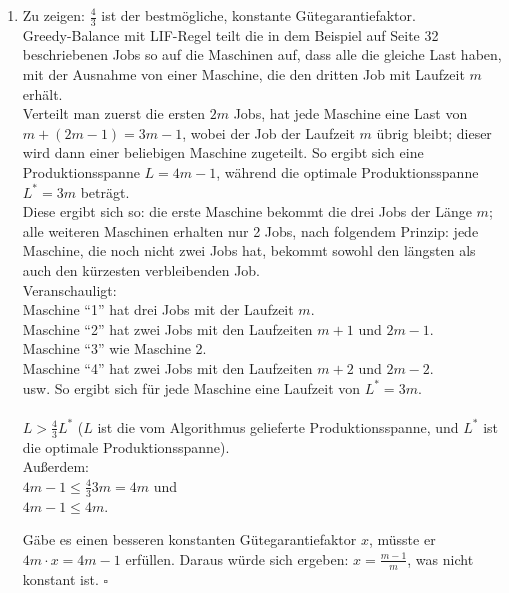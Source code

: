 \documentclass[a4paper]{scrartcl}
\begin{document}
\begin{enumerate}[label=\bfseries \arabic*.]
\begin{enumerate}
\end{enumerate}

\item %
    Zu zeigen: $\frac{4}{3}$ ist der bestmögliche, konstante Gütegarantiefaktor.\\
    Greedy-Balance mit LIF-Regel teilt die in dem Beispiel auf Seite 32 beschriebenen Jobs so
    auf die Maschinen auf, dass alle die gleiche Last haben, mit der Ausnahme von einer Maschine,
    die den dritten Job mit Laufzeit $m$ erhält.\\
    Verteilt man zuerst die ersten $2m$ Jobs, hat jede Maschine eine Last von $m + (2m-1) = 3m-1$, wobei der Job
    der Laufzeit $m$ übrig bleibt; dieser wird dann einer beliebigen Maschine zugeteilt.
    So ergibt sich eine Produktionsspanne $L=4m-1$, während die optimale Produktionsspanne
    $L^*=3m$ beträgt.
    \\
    Diese ergibt sich so: die erste Maschine bekommt die drei Jobs der Länge $m$; alle weiteren Maschinen
    erhalten nur 2 Jobs, nach folgendem Prinzip: jede Maschine, die noch nicht zwei Jobs hat, bekommt
    sowohl den längsten als auch den kürzesten verbleibenden Job.\\
    \newpage
    Veranschauligt:\\
    Maschine ``1'' hat drei Jobs mit der Laufzeit $m$.\\
    Maschine ``2'' hat zwei Jobs mit den Laufzeiten $m+1$ und $2m-1$.\\
    Maschine ``3'' wie Maschine 2.\\
    Maschine ``4'' hat zwei Jobs mit den Laufzeiten $m+2$ und $2m-2$.\\
    usw. So ergibt sich für jede Maschine eine Laufzeit von $L^*=3m$.
    \\ \\
    $L > \frac{4}{3}L^*$ ($L$ ist die vom Algorithmus gelieferte Produktionsspanne, und $L^*$ ist die
    optimale Produktionsspanne).\\
    Außerdem:\\
    $4m-1 \leq \frac{4}{3} 3m = 4m$ und\\
    $4m-1 \leq 4m$.

    Gäbe es einen besseren konstanten Gütegarantiefaktor $x$, müsste er $4m \cdot x = 4m-1$ erfüllen.
    Daraus würde sich ergeben:
    $x = \frac{m-1}{m}$, was nicht konstant ist. $\square$
\end{enumerate}
\end{document}
